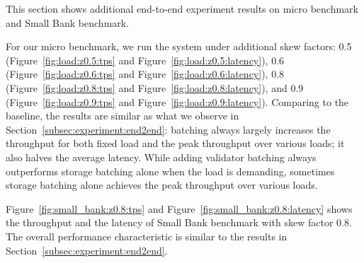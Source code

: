 \begin{appendix}
This section shows additional end-to-end experiment results on micro benchmark and Small Bank benchmark.

For our micro benchmark, we run the system under additional skew factors: 0.5 (Figure~\ref{fig:load:z0.5:tps} and Figure~\ref{fig:load:z0.5:latency}), 0.6 (Figure~\ref{fig:load:z0.6:tps} and Figure~\ref{fig:load:z0.6:latency}), 0.8 (Figure~\ref{fig:load:z0.8:tps} and Figure~\ref{fig:load:z0.8:latency}), and 0.9 (Figure~\ref{fig:load:z0.9:tps} and Figure~\ref{fig:load:z0.9:latency}). Comparing to the baseline, the results are similar as what we observe in Section~\ref{subsec:experiment:end2end}: batching always largely increases the throughput for both fixed load and the peak throughput over various loads; it also halves the average latency. While adding validator batching always outperforms storage batching alone when the load is demanding, sometimes storage batching alone achieves the peak throughput over various loads. 

Figure~\ref{fig:small_bank:z0.8:tps} and Figure~\ref{fig:small_bank:z0.8:latency} shows the throughput and the latency of Small Bank benchmark with skew factor 0.8. The overall performance characteristic is similar to the results in Section~\ref{subsec:experiment:end2end}.

\end{appendix}
